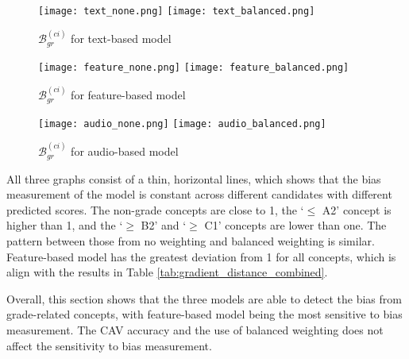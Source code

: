 \begin{figure}[H]
    \centering
    \begin{minipage}[t]{0.32\textwidth}
        \centering
        \texttt{[image: text\_none.png]}
        \hfill
        \texttt{[image: text\_balanced.png]}
        \caption{$\mathcal{B}^{(ci)}_{gr}$ for text-based model}
        \label{fig:gradient_distance_text}
    \end{minipage}
    \hfill
    \begin{minipage}[t]{0.32\textwidth}
        \centering
        \texttt{[image: feature\_none.png]}
        \hfill
        \texttt{[image: feature\_balanced.png]}
        \caption{$\mathcal{B}^{(ci)}_{gr}$ for feature-based model}
        \label{fig:gradient_distance_feature}
    \end{minipage}
    \hfill
    \begin{minipage}[t]{0.32\textwidth}
        \centering
        \texttt{[image: audio\_none.png]}
        \hfill
        \texttt{[image: audio\_balanced.png]}
        \caption{$\mathcal{B}^{(ci)}_{gr}$ for audio-based model}
        \label{fig:gradient_distance_audio}
    \end{minipage}
\end{figure}


All three graphs consist of a thin, horizontal lines, which shows that the bias measurement of the model is constant across different candidates with different predicted scores. The non-grade concepts are close to 1, the `$\leq$ A2' concept is higher than 1, and the `$\geq$ B2' and `$\geq$ C1' concepts are lower than one. The pattern between those from no weighting and balanced weighting is similar. Feature-based model has the greatest deviation from 1 for all concepts, which is align with the results in Table \ref{tab:gradient_distance_combined}.

Overall, this section shows that the three models are able to detect the bias from grade-related concepts, with feature-based model being the most sensitive to bias measurement. The CAV accuracy and the use of balanced weighting does not affect the sensitivity to bias measurement.

